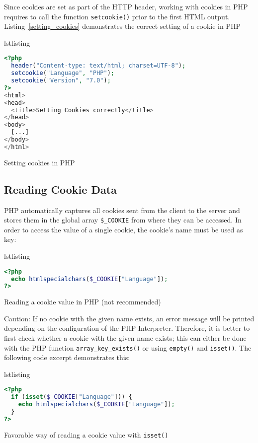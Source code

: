 \documentclass[a4paper, justified, notoc]{tufte-handout} %
\makeatletter
\newenvironment{listing}[1][htbp]
  {\ifvmode\else\unskip\fi\begin{@tufte@float}[#1]{lstlisting}{}}
  {\end{@tufte@float} } %
\makeatother
\begin{document}
Since cookies are set as part of the HTTP header, working with cookies in PHP requires to call the function \texttt{setcookie()} prior to the first HTML output. Listing~\ref{setting_cookies} demonstrates the correct setting of a cookie in PHP


\begin{listing}
\begin{lstlisting}[language=PHP]
<?php
  header("Content-type: text/html; charset=UTF-8");
  setcookie("Language", "PHP");
  setcookie("Version", "7.0");
?>
<html>
<head>
  <title>Setting Cookies correctly</title>
</head>
<body>
  [...]
</body>
</html>
\end{lstlisting}
	\caption{Setting cookies in PHP}
	\label{setting_cookies}
\end{listing}

\subsection{Reading Cookie Data} %
\label{sub:reading_cookie_data}
PHP automatically captures all cookies sent from the client to the server and stores them in the global array \texttt{\$\_COOKIE} from where they can be accessed. 
In order to access the value of a single cookie, the cookie's name must be used as key:
\begin{listing}
\begin{lstlisting}[language=PHP]
<?php
  echo htmlspecialchars($_COOKIE["Language"]);
?>
\end{lstlisting}
	\caption{Reading a cookie value in PHP (not recommended)}
	\label{setting_cookies}
\end{listing}

Caution: If no cookie with the given name exists, an error message will be printed depending on the configuration of the PHP Interpreter. Therefore, it is better to first check whether a cookie with the given name exists; this can either be done with the PHP function \texttt{array\_key\_exists()} or using \texttt{empty()} and \texttt{isset()}. The following code excerpt demonstrates this:
\begin{listing}
\begin{lstlisting}[language=PHP]
<?php
  if (isset($_COOKIE["Language"])) {
    echo htmlspecialchars($_COOKIE["Language"]);
  }
?>
\end{lstlisting}
	\caption{Favorable way of reading a cookie value with \texttt{isset()}}
	\label{setting_cookies}
\end{listing}
\end{document}
